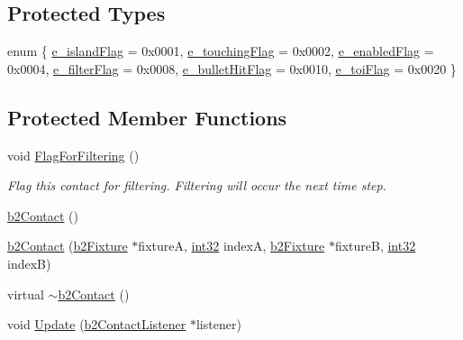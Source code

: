 \subsection*{Protected Types}
\begin{DoxyCompactItemize}
\item 
enum \{ \newline
\mbox{\hyperlink{classb2_contact_ab8f00a9c04b3eea54a9c5bab29328c3eaad83700b4de33a2e3133ea0d98aa1c8b}{e\+\_\+island\+Flag}} = 0x0001, 
\mbox{\hyperlink{classb2_contact_ab8f00a9c04b3eea54a9c5bab29328c3eaff50bb5872ede1ef890c5b4d063c6378}{e\+\_\+touching\+Flag}} = 0x0002, 
\mbox{\hyperlink{classb2_contact_ab8f00a9c04b3eea54a9c5bab29328c3ea63ecc7ff371a26143b250e8f315576a7}{e\+\_\+enabled\+Flag}} = 0x0004, 
\mbox{\hyperlink{classb2_contact_ab8f00a9c04b3eea54a9c5bab29328c3eab8e92ae0c3f97e9d95aedb30238e6817}{e\+\_\+filter\+Flag}} = 0x0008, 
\newline
\mbox{\hyperlink{classb2_contact_ab8f00a9c04b3eea54a9c5bab29328c3eaa3f6336608fedaf5a3edd8d7199af567}{e\+\_\+bullet\+Hit\+Flag}} = 0x0010, 
\mbox{\hyperlink{classb2_contact_ab8f00a9c04b3eea54a9c5bab29328c3eaffeff4bfd177073172521d6be7e202de}{e\+\_\+toi\+Flag}} = 0x0020
 \}
\end{DoxyCompactItemize}
\subsection*{Protected Member Functions}
\begin{DoxyCompactItemize}
\item 
void \mbox{\hyperlink{classb2_contact_a44a3d32149021269eb9dfd4015c98e0d}{Flag\+For\+Filtering}} ()
\begin{DoxyCompactList}\small\item\em Flag this contact for filtering. Filtering will occur the next time step. \end{DoxyCompactList}\item 
\mbox{\hyperlink{classb2_contact_a04b21bf6fcf41ba19866a2d57c4a2060}{b2\+Contact}} ()
\item 
\mbox{\hyperlink{classb2_contact_a2d1c98399cef1eb95c6ee8aad8257f60}{b2\+Contact}} (\mbox{\hyperlink{classb2_fixture}{b2\+Fixture}} $\ast$fixtureA, \mbox{\hyperlink{b2_settings_8h_a43d43196463bde49cb067f5c20ab8481}{int32}} indexA, \mbox{\hyperlink{classb2_fixture}{b2\+Fixture}} $\ast$fixtureB, \mbox{\hyperlink{b2_settings_8h_a43d43196463bde49cb067f5c20ab8481}{int32}} indexB)
\item 
virtual \mbox{\hyperlink{classb2_contact_a37368b233a5ac0d698310b300426ce16}{$\sim$b2\+Contact}} ()
\item 
void \mbox{\hyperlink{classb2_contact_a218a66a6c34e3de1c428aa73a0680dfe}{Update}} (\mbox{\hyperlink{classb2_contact_listener}{b2\+Contact\+Listener}} $\ast$listener)
\end{DoxyCompactItemize}

